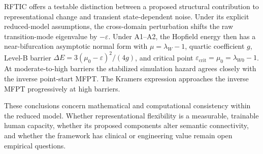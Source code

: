 \documentclass[a4paper,twocolumn,10pt]{article}
\newcommand{\eps}{\varepsilon}
\newcommand{\dE}{\Delta E}
\begin{document}
RFTIC offers a testable distinction between a proposed structural contribution to representational
change and transient state-dependent noise. Under its explicit reduced-model assumptions, the
cross-domain perturbation shifts the raw transition-mode eigenvalue by $-\eps$. Under A1--A2, the
Hopfield energy then has a near-bifurcation asymptotic normal form with
$\mu=\lambda_W-1$, quartic coefficient $g$, Level-B barrier
$\dE=3(\mu_0-\eps)^2/(4g)$, and critical point
$\eps_{\mathrm{crit}}=\mu_0=\lambda_{W0}-1$. At moderate-to-high barriers the stabilized
simulation hazard agrees closely with the inverse point-start MFPT. The Kramers expression
approaches the inverse MFPT progressively at high barriers.

These conclusions concern mathematical and computational consistency within the reduced model.
Whether representational flexibility is a measurable, trainable human capacity, whether its proposed
components alter semantic connectivity, and whether the framework has clinical or engineering value
remain open empirical questions.






\end{document}
